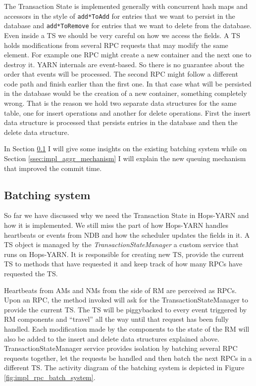 The Transaction State is implemented generally with concurrent hash maps and
accessors in the style of \texttt{add*ToAdd} for entries that we
want to persist in the database and \texttt{add*ToRemove} for entries
that we want to delete from the database. Even inside a TS we should
be very careful on how we access the fields. A TS holds modifications
from several RPC requests that may modify the same element. For
example one RPC might create a new container and the next one to
destroy it. YARN internals are event-based. So there is no guarantee
about the order that events will be processed. The second RPC might
follow a different code path and finish earlier than the first one. In
that case what will be persisted in the database would be the creation
of a new container, something completely wrong. That is the reason
we hold two separate data structures for the same table, one for
insert operations and another for delete operations. First the insert
data structure is processed that persists entries in the database and
then the delete data structure.

In Section \ref{ssec:impl_batch_system} I will give some insights on
the existing batching system while on Section
\ref{ssec:impl_aggr_mechanism} I will explain the new queuing
mechanism that improved the commit time.

\subsection{Batching system}
\label{ssec:impl_batch_system}
So far we have discussed why we need the Transaction State in
Hops-YARN and how it is implemented. We still miss the part of how
Hops-YARN handles heartbeats or events from NDB and how the scheduler
updates the fields in it. A TS object is managed by the
\emph{TransactionStateManager} a custom service that runs on Hops-YARN.
It is responsible for creating new TS, provide the
current TS to methods that have requested it and keep track of how many
RPCs have requested the TS.

Heartbeats from AMs and NMs from the side of RM are perceived as
RPCs. Upon an RPC, the method invoked will ask for the TransactionStateManager
to provide the current TS. The TS will be piggybacked to every event
triggered by RM components and ``travel'' all the way until that
request has been fully handled. Each modification made by the components
to the state of the RM will also be added to the insert and delete
data structures explained above. TransactionStateManager service
provides isolation by batching several RPC requests together, let the
requests be handled and then batch the next RPCs in a different
TS. The activity diagram of the batching system is depicted in Figure
\ref{fig:impl_rpc_batch_system}.

